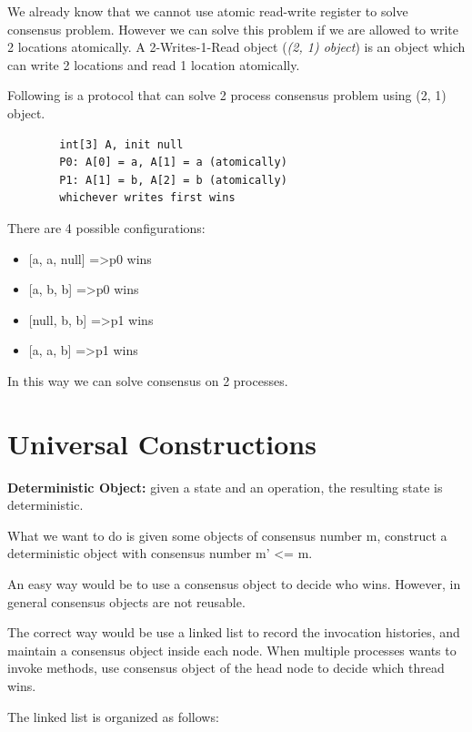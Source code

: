 \documentclass[twoside]{article}
\begin{document}
We already know that we cannot use atomic read-write register to solve consensus problem. However we can solve this problem if we are allowed to write 2 locations atomically. A 2-Writes-1-Read object (\textit{(2, 1) object}) is an object which can write 2 locations and read 1 location atomically. 

Following is a protocol that can solve 2 process consensus problem using (2, 1) object.

\begin{center}
    \begin{lstlisting}
        int[3] A, init null
        P0: A[0] = a, A[1] = a (atomically)
        P1: A[1] = b, A[2] = b (atomically)
        whichever writes first wins
    \end{lstlisting}
\end{center}

There are 4 possible configurations:

\begin{itemize}
    \item {[a, a, null]} =\textgreater p0 wins
    \item {[a, b, b]} =\textgreater p0 wins
    \item {[null, b, b]} =\textgreater p1 wins
    \item {[a, a, b]} =\textgreater p1 wins
\end{itemize}

In this way we can solve consensus on 2 processes.

\section{Universal Constructions}

\textbf{Deterministic Object:} given a state and an operation, the resulting state is deterministic.

What we want to do is given some objects of consensus number m, construct a deterministic object with consensus number m' \textless= m.

An easy way would be to use a consensus object to decide who wins. However, in general consensus objects are not reusable.

The correct way would be use a linked list to record the invocation histories, and maintain a consensus object inside each node. When multiple processes wants to invoke methods, use consensus object of the head node to decide which thread wins.

The linked list is organized as follows:
\end{document}
